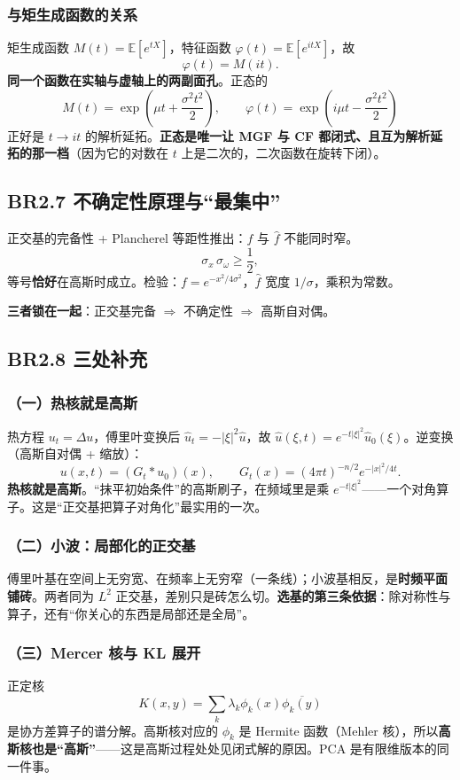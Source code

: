 \subsubsection{与矩生成函数的关系}

矩生成函数 $M(t)=\mathbb{E}[e^{tX}]$，特征函数 $\varphi(t)=\mathbb{E}[e^{itX}]$，故
\[
\varphi(t)=M(it).
\]
\textbf{同一个函数在实轴与虚轴上的两副面孔}。正态的
\[
M(t)=\exp\left(\mu t+\frac{\sigma^2t^2}{2}\right),\qquad
\varphi(t)=\exp\left(i\mu t-\frac{\sigma^2t^2}{2}\right)
\]
正好是 $t\to it$ 的解析延拓。\textbf{正态是唯一让 MGF 与 CF 都闭式、且互为解析延拓的那一档}（因为它的对数在 $t$ 上是二次的，二次函数在旋转下闭）。

\subsection{BR2.7 不确定性原理与“最集中”}

正交基的完备性 + Plancherel 等距性推出：$f$ 与 $\hat f$ 不能同时窄。
\[
\sigma_x\,\sigma_\omega\ge\frac12,
\]
等号\textbf{恰好}在高斯时成立。检验：$f=e^{-x^2/4\sigma^2}$，$\hat f$ 宽度 $1/\sigma$，乘积为常数。

\textbf{三者锁在一起}：正交基完备 $\Rightarrow$ 不确定性 $\Rightarrow$ 高斯自对偶。

\subsection{BR2.8 三处补充}

\subsubsection{（一）热核就是高斯}

热方程 $u_t=\Delta u$，傅里叶变换后 $\hat u_t=-|\xi|^2\hat u$，故
$\hat u(\xi,t)=e^{-t|\xi|^2}\hat u_0(\xi)$。逆变换（高斯自对偶 + 缩放）：
\[
u(x,t)=(G_t*u_0)(x),\qquad G_t(x)=(4\pi t)^{-n/2}e^{-|x|^2/4t}.
\]
\textbf{热核就是高斯}。“抹平初始条件”的高斯刷子，在频域里是乘 $e^{-t|\xi|^2}$——一个对角算子。这是“正交基把算子对角化”最实用的一次。

\subsubsection{（二）小波：局部化的正交基}

傅里叶基在空间上无穷宽、在频率上无穷窄（一条线）；小波基相反，是\textbf{时频平面铺砖}。两者同为 $L^2$ 正交基，差别只是砖怎么切。\textbf{选基的第三条依据}：除对称性与算子，还有“你关心的东西是局部还是全局”。

\subsubsection{（三）Mercer 核与 KL 展开}

正定核
\[
K(x,y)=\sum_k\lambda_k\phi_k(x)\overline{\phi_k(y)}
\]
是协方差算子的谱分解。高斯核对应的 $\phi_k$ 是 Hermite 函数（Mehler 核），所以\textbf{高斯核也是“高斯”}——这是高斯过程处处见闭式解的原因。PCA 是有限维版本的同一件事。